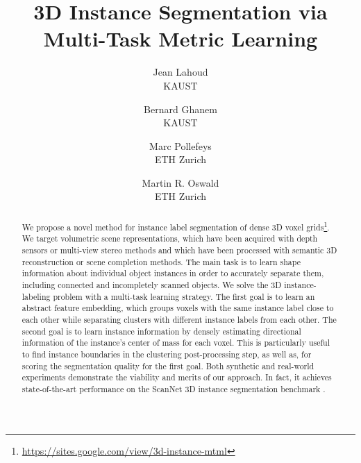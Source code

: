 \documentclass[10pt,twocolumn,letterpaper]{article}
\begin{document}
\title{3D Instance Segmentation via Multi-Task Metric Learning}

\author{Jean Lahoud \\
KAUST \\
\and
Bernard Ghanem\\
KAUST\\
\and
Marc Pollefeys \\
ETH Zurich\\
\and
Martin R. Oswald \\
ETH Zurich\\
}




\maketitle
\thispagestyle{empty}


\begin{abstract}
We propose a novel method for instance label segmentation of dense 3D voxel grids\footnote{\url{https://sites.google.com/view/3d-instance-mtml}}.
We target volumetric scene representations, which have been acquired with depth sensors or multi-view stereo methods and which have been processed with semantic 3D reconstruction or scene completion methods. The main task is to learn shape information about individual object instances in order to accurately separate them, including connected and incompletely scanned objects.
We solve the 3D instance-labeling problem with a multi-task learning strategy.
The first goal is to learn an abstract feature embedding, which groups voxels with the same instance label close to each other while separating clusters with different instance labels from each other.
The second goal is to learn instance information by densely estimating directional information of the instance's center of mass for each voxel.
This is particularly useful to find instance boundaries in the clustering post-processing step, as well as, for scoring the segmentation quality for the first goal.
Both synthetic and real-world experiments demonstrate the viability and merits of our approach.
In fact, it achieves state-of-the-art performance on the ScanNet 3D instance segmentation benchmark \cite{Dai-et-al-CVPR-2017}. 
\end{abstract}
 
\end{document}
